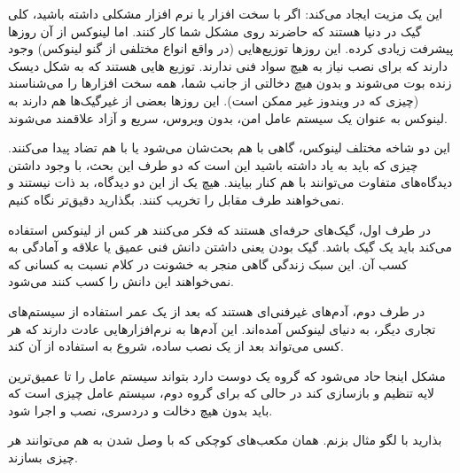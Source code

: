 این یک مزیت ایجاد می‌کند: اگر با سخت افزار یا نرم افزار مشکلی داشته باشید، کلی گیک در دنیا هستند که حاضرند روی مشکل شما کار کنند.
اما لینوکس از آن روزها پیشرفت زیادی کرده. این روزها توزیع‌هایی (در واقع انواع مختلفی از گنو لینوکس) وجود دارند که برای نصب نیاز به هیچ سواد فنی ندارند. توزیع هایی هستند که به شکل دیسک زنده بوت می‌شوند و بدون
\emph{هیچ}
دخالتی از جانب شما، همه سخت افزارها را می‌شناسند (چیزی که در ویندوز غیر ممکن است). این روزها بعضی از غیرگیک‌ها هم دارند به لینوکس به عنوان یک سیستم عامل امن، بدون ویروس، سریع و آزاد علاقمند می‌شوند.

این دو شاخه مختلف لینوکس، گاهی با هم بحث‌شان می‌شود یا با هم تضاد پیدا می‌کنند. چیزی که باید به یاد داشته باشید این است که دو طرف این بحث،‌ با وجود داشتن دیدگاه‌های متفاوت می‌توانند با هم کنار بیایند. هیچ یک از این دو دیدگاه، بد ذات نیستند و نمی‌خواهند طرف مقابل را تخریب کنند. بگذارید دقیق‌تر نگاه کنیم.

در طرف اول، گیک‌های حرفه‌ای هستند که فکر می‌کنند هر کس از لینوکس استفاده می‌کند باید یک گیک باشد. گیک بودن یعنی داشتن دانش فنی عمیق یا علاقه و آمادگی به کسب آن. این سبک زندگی گاهی منجر به خشونت در کلام نسبت به کسانی که نمی‌خواهند این دانش را کسب کنند می‌شود.

در طرف دوم،‌ آدم‌های غیرفنی‌ای هستند که بعد از یک عمر استفاده از سیستم‌های تجاری دیگر، به دنیای لینوکس آمده‌اند. این آدم‌ها به نرم‌افزارهایی عادت دارند که هر کسی می‌تواند بعد از یک نصب ساده، شروع به استفاده از آن کند.

مشکل اینجا حاد می‌شود که گروه یک دوست دارد بتواند سیستم عامل را تا عمیق‌ترین لایه تنظیم و بازسازی کند در حالی که برای گروه دوم، سیستم عامل چیزی است که باید بدون هیچ دخالت و دردسری، نصب و اجرا شود.

بذارید با لگو مثال بزنم. همان مکعب‌های کوچکی که با وصل شدن به هم می‌توانند هر چیزی بسازند. 

